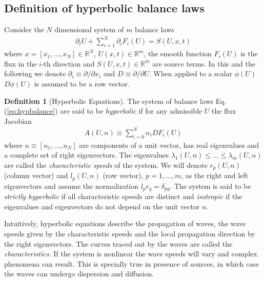\documentclass[11pt, reqno]{amsart}
\newcommand{\eqr}[1]{Eq.\thinspace(#1)}
\newcommand{\spfrac}[2]{{\partial_{#1}} {#2}}
\theoremstyle{definition}
\newtheorem{dfn}{Definition}
\begin{document}
\subsection{Definition of hyperbolic balance laws}

Consider the $N$ dimensional system of $m$ balance laws
\begin{align}
  \spfrac{t}{U} + \sum_{i=1}^N \spfrac{i}{F_i(U)} = S(U,x,t) 
  \label{eq:hypbalance}
\end{align}
where $x = [x_1,\ldots,x_N] \in \mathbb{R}^N$, $U(x,t) \in
\mathbb{R}^m$, the smooth function $F_i(U)$ is the flux in the $i$-th
direction and $S(U,x,t) \in \mathbb{R}^m$ are source terms. In this
and the following we denote $\partial_i \equiv \partial/\partial x_i$
and $D \equiv \partial/\partial U$. When applied to a scalar $\phi(U)$
$D\phi(U)$ is assumed to be a row vector.

\begin{dfn}[Hyperbolic Equations]
  The system of balance laws \eqr{\ref{eq:hypbalance}} are said to be
  \emph{hyperbolic} if for any admissible $U$ the flux Jacobian
  \begin{align}
    A(U,n) \equiv \sum_{i=0}^N n_i DF_i(U)
  \end{align}
  where $n\equiv [n_1,\ldots,n_N]$ are components of a unit vector,
  has real eigenvalues and a complete set of right eigenvectors. The
  eigenvalues $\lambda_1(U,n) \le \ldots \le \lambda_m(U,n)$ are
  called the \emph{characteristic speeds} of the system. We will
  denote $r_p(U,n)$ (column vector) and $l_p(U,n)$ (row vector),
  $p=1,\ldots,m$, as the right and left eigenvectors and assume the
  normalization $l_p r_q = \delta_{pg}$.  The system is said to be
  \emph{strictly hyperbolic} if all characteristic speeds are distinct
  and \emph{isotropic} if the eigenvalues and eigenvectors do not
  depend on the unit vector $n$.
\end{dfn}

Intuitively, hyperbolic equations describe the propagation of waves,
the wave speeds given by the characteristic speeds and the local
propagation direction by the right eigenvectors. The curves traced out
by the waves are called the \emph{characteristics}. If the system is
nonlinear the wave speeds will vary and complex phenomena can
result. This is specially true in presence of sources, in which case
the waves can undergo dispersion and diffusion.
\end{document}
